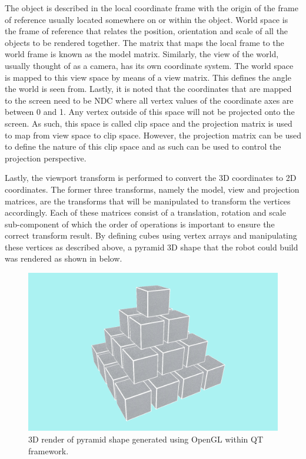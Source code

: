 The object is described in the local coordinate frame with the origin of the frame of reference usually located somewhere on or within the object. World space is the frame of reference that relates the position, orientation and scale of all the objects to be rendered together. The matrix that maps the local frame to the world frame is known as the model matrix. Similarly, the view of the world, usually thought of as a camera, has its own coordinate system. The world space is mapped to this view space by means of a view matrix. This defines the angle the world is seen from. Lastly, it is noted that the coordinates that are mapped to the screen need to be \ac{NDC} where all vertex values of the coordinate axes are between 0 and 1. Any vertex outside of this space will not be projected onto the screen. As such, this space is called clip space and the projection matrix is used to map from view space to clip space. However, the projection matrix can be used to define the nature of this clip space and as such can be used to control the projection perspective. 

Lastly, the viewport transform is performed to convert the 3D coordinates to 2D coordinates. The former three transforms, namely the model, view and projection matrices, are the transforms that will be manipulated to transform the vertices accordingly. Each of these matrices consist of a translation, rotation and scale sub-component of which the order of operations is important to ensure the correct transform result. By defining cubes using vertex arrays and manipulating these vertices as described above, a pyramid 3D shape that the robot could build was rendered as shown in  below.

\begin{figure}[H]
	\centering
	\includegraphics[width=0.8\linewidth]{figures/202110/initial-opengl-shape.PNG}
	\caption{3D render of pyramid shape generated using OpenGL within QT framework.}
	\label{fig:initial-opengl}
\end{figure}

\pendsign
